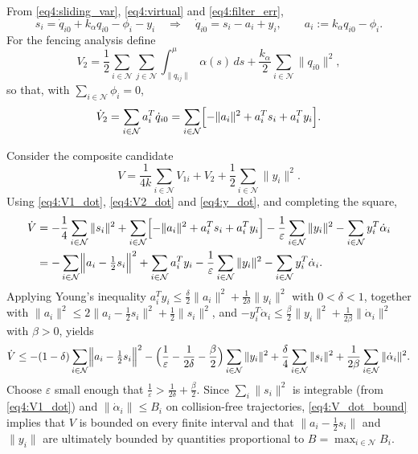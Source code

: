From \eqref{eq4:sliding_var}, \eqref{eq4:virtual} and \eqref{eq4:filter_err},
\begin{equation}\label{eq4:qdot_rel}
	s_i = \dot{q}_{i0} + k_\alpha q_{i0} - \phi_i - y_i
	\quad\Longrightarrow\quad
	\dot{q}_{i0} = s_i - a_i + y_i,\qquad a_i := k_\alpha q_{i0} - \phi_i.
\end{equation}
For the fencing analysis define
\begin{equation}\label{eq4:V2}
	V_2 = \frac12\sum_{i\in\mathcal{N}}\sum_{j\in\mathcal{N}}
	\int_{\|q_{ij}\|}^{\mu}\alpha(s)\,ds
	+ \frac{k_\alpha}{2}\sum_{i\in\mathcal{N}}\|q_{i0}\|^2,
\end{equation}
so that, with $\sum_{i\in\mathcal{N}}\phi_i = 0$,
\begin{equation}\label{eq4:V2_dot}
	\dot{V}_2 = \sum_{i\in\mathcal{N}} a_i^T \dot{q}_{i0}
	= \sum_{i\in\mathcal{N}}\Bigl[-\|a_i\|^2 + a_i^T s_i + a_i^T y_i\Bigr].
\end{equation}

Consider the composite candidate
\begin{equation}\label{eq4:V}
	V = \frac{1}{4k}\sum_{i\in\mathcal{N}} V_{1i}
	+ V_2 + \frac12\sum_{i\in\mathcal{N}}\|y_i\|^2.
\end{equation}
Using \eqref{eq4:V1_dot}, \eqref{eq4:V2_dot} and \eqref{eq4:y_dot}, and completing the
square,
\begin{align}
	\dot{V} &= -\frac14\sum_{i\in\mathcal{N}}\|s_i\|^2
		+ \sum_{i\in\mathcal{N}}\Bigl[-\|a_i\|^2 + a_i^T s_i + a_i^T y_i\Bigr]
		- \frac{1}{\varepsilon}\sum_{i\in\mathcal{N}}\|y_i\|^2
		- \sum_{i\in\mathcal{N}} y_i^T\dot{\alpha}_i \notag \\
	&= -\sum_{i\in\mathcal{N}}\Bigl\|a_i - \tfrac12 s_i\Bigr\|^2
		+ \sum_{i\in\mathcal{N}} a_i^T y_i
		- \frac{1}{\varepsilon}\sum_{i\in\mathcal{N}}\|y_i\|^2
		- \sum_{i\in\mathcal{N}} y_i^T\dot{\alpha}_i. \label{eq4:V_dot}
\end{align}
Applying Young's inequality
$a_i^T y_i \le \tfrac{\delta}{2}\|a_i\|^2 + \tfrac{1}{2\delta}\|y_i\|^2$ with
$0<\delta<1$, together with
$\|a_i\|^2 \le 2\|a_i - \tfrac12 s_i\|^2 + \tfrac12\|s_i\|^2$, and
$-y_i^T\dot{\alpha}_i \le \tfrac{\beta}{2}\|y_i\|^2 + \tfrac{1}{2\beta}\|\dot{\alpha}_i\|^2$
with $\beta>0$, yields
\begin{equation}\label{eq4:V_dot_bound}
	\dot{V} \le -(1-\delta)\sum_{i\in\mathcal{N}}\Bigl\|a_i - \tfrac12 s_i\Bigr\|^2
		- \Bigl(\frac{1}{\varepsilon}-\frac{1}{2\delta}-\frac{\beta}{2}\Bigr)
			\sum_{i\in\mathcal{N}}\|y_i\|^2
		+ \frac{\delta}{4}\sum_{i\in\mathcal{N}}\|s_i\|^2
		+ \frac{1}{2\beta}\sum_{i\in\mathcal{N}}\|\dot{\alpha}_i\|^2.
\end{equation}
Choose $\varepsilon$ small enough that
$\frac{1}{\varepsilon} > \frac{1}{2\delta} + \frac{\beta}{2}$. Since
$\sum_i\|s_i\|^2$ is integrable (from \eqref{eq4:V1_dot}) and
$\|\dot{\alpha}_i\|\le B_i$ on collision-free trajectories, \eqref{eq4:V_dot_bound}
implies that $V$ is bounded on every finite interval and that
$\|a_i - \tfrac12 s_i\|$ and $\|y_i\|$ are ultimately bounded by quantities proportional to
$B = \max_{i\in\mathcal{N}} B_i$.

